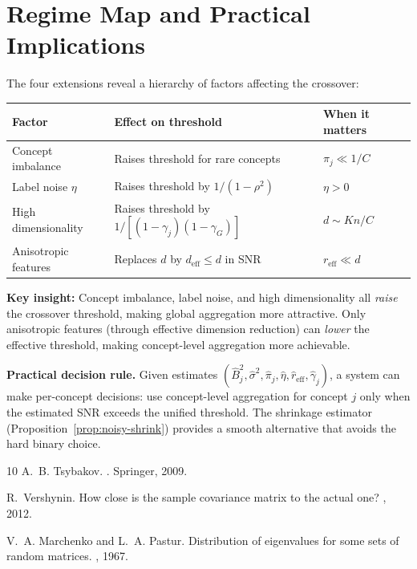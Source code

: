 \documentclass[11pt,a4paper]{article}
\newcommand{\deff}{d_{\mathrm{eff}}}
\begin{document}
\section{Regime Map and Practical Implications}

The four extensions reveal a hierarchy of factors affecting the crossover:

\begin{center}
\begin{tabular}{lll}
\hline
\textbf{Factor} & \textbf{Effect on threshold} & \textbf{When it matters}\\
\hline
Concept imbalance & Raises threshold for rare concepts & $\pi_j \ll 1/C$\\
Label noise $\eta$ & Raises threshold by $1/(1-\rho^2)$ & $\eta > 0$\\
High dimensionality & Raises threshold by $1/[(1-\gamma_j)(1-\gamma_G)]$ & $d \sim Kn/C$\\
Anisotropic features & Replaces $d$ by $\deff \leq d$ in SNR & $r_{\mathrm{eff}} \ll d$\\
\hline
\end{tabular}
\end{center}

\textbf{Key insight:} Concept imbalance, label noise, and high dimensionality all \emph{raise} the crossover threshold, making global aggregation more attractive. Only anisotropic features (through effective dimension reduction) can \emph{lower} the effective threshold, making concept-level aggregation more achievable.

\textbf{Practical decision rule.} Given estimates $(\hat{B}_j^2, \hat{\sigma}^2, \hat{\pi}_j, \hat{\eta}, \hat{r}_{\mathrm{eff}}, \hat{\gamma}_j)$, a system can make per-concept decisions: use concept-level aggregation for concept $j$ only when the estimated SNR exceeds the unified threshold. The shrinkage estimator (Proposition~\ref{prop:noisy-shrink}) provides a smooth alternative that avoids the hard binary choice.


\begin{thebibliography}{10}
A.~B. Tsybakov.
.
\newblock Springer, 2009.

R.~Vershynin.
\newblock How close is the sample covariance matrix to the actual one?
, 2012.

V.~A. Marchenko and L.~A. Pastur.
\newblock Distribution of eigenvalues for some sets of random matrices.
, 1967.
\end{thebibliography}
\end{document}
